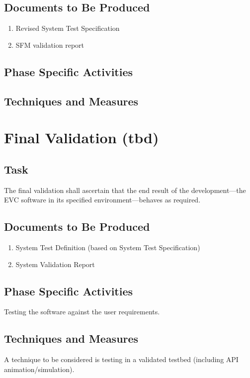 \subsection{Documents to Be Produced}
\label{sec:sfm-valid-docum-be-prod}

\begin{enumerate}
\item Revised System Test Specification
\item SFM validation report
\end{enumerate}

\subsection{Phase Specific Activities}
\label{sec:sfm-valid-phase-spec-activ}

\tbd{}

\subsection{Techniques and Measures}
\label{sec:sfm-valid-techniques-measures}

\tbd{}

\section{Final Validation (tbd)}
\label{sec:final-validation}

\subsection{Task}
\label{sec:final-valid-task}

The final validation shall ascertain that the end result of the
development---the EVC software in its specified environment---behaves
as required. 

\subsection{Documents to Be Produced}
\label{sec:final-valid-docum-be-prod}

\begin{enumerate}
\item System Test Definition (based on System Test Specification)
\item System Validation Report
\end{enumerate}

\subsection{Phase Specific Activities}
\label{sec:final-valid-phase-spec-activ}

Testing the software against the user requirements.

\subsection{Techniques and Measures}
\label{sec:final-valid-techniques-measures}

A technique to be considered is testing in a validated testbed
(including API animation/simulation).


